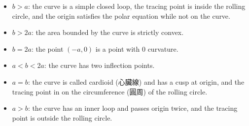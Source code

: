 \documentclass[a4paper,12pt]{report}
\begin{document}
\begin{itemize}
\begin{itemize}
\subsubsection{Quadratic curve}
\[r=\frac{\ell}{1-\varepsilon\cos(\theta+\varphi)},\quad\ell>0\land\varepsilon\geq0\]
is a quadratic curve with semi-latus rectum $\ell$, eccentricity $\varepsilon$, and one focus at origin.
\subsubsection{Limaçon (蝸線)}
A limaçon or limacon [limasɔ̃], also known as a limaçon of Pascal or Pascal's Snail, is defined as a roulette curve formed by the path of a point fixed to a circle when that circle rolls around the outside of a circle of equal radius. The polar equation of a limaçon has the form
\[r=b+a\cos(\theta-\varphi),\quad a,b>0,\]
and for $b>a$ also with constraint $r\neq 0$, where $b$ is the radius of the circles and $a$ is the distance from rolling circle center to tracing point.
\bit
\item $b>a$: the curve is a simple closed loop, the tracing point is inside the rolling circle, and the origin satisfies the polar equation while not on the curve.
\item $b>2a$: the area bounded by the curve is strictly convex.
\item $b=2a$: the point $(-a,0)$ is a point with $0$ curvature.
\item $a<b<2a$: the curve has two inflection points.
\item $a=b$: the curve is called cardioid (心臟線) and has a cusp at origin, and the tracing point in on the circumference (圓周) of the rolling circle.
\item $a>b$: the curve has an inner loop and passes origin twice, and the tracing point is outside the rolling circle.
\eit

\end{itemize}
\end{itemize}
\end{document}
